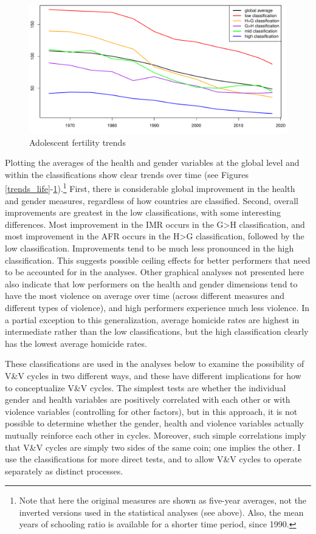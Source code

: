 \documentclass[12pt]{article}
\begin{document}
\begin{figure}[!htb]
    \centering
    \caption{Adolescent fertility trends}
    \label{trends_afr}
    \includegraphics[width=\textwidth]{trend_asfr_adol_wpp.pdf}
\end{figure}

Plotting the averages of the health and gender variables at the global level and within the classifications show clear trends over time (see Figures \ref{trends_life}-\ref{trends_afr}).\footnote{Note that here the original measures are shown as five-year averages, not the inverted versions used in the statistical analyses (see above). Also, the mean years of schooling ratio is available for a shorter time period, since 1990.}
First, there is considerable global improvement in the health and gender measures, regardless of how countries are classified.
Second, overall improvements are greatest in the low classifications, with some interesting differences. Most improvement in the IMR occurs in the {G>H} classification, and most improvement in the AFR occurs in the {H>G} classification, followed by the low classification.
Improvements tend to be much less pronounced in the high classification.
This suggests possible ceiling effects for better performers that need to be accounted for in the analyses.
Other graphical analyses not presented here also indicate that low performers on the health and gender dimensions tend to have the most violence on average over time (across different measures and different types of violence), and high performers experience much less violence. In a partial exception to this generalization, average homicide rates are highest in intermediate rather than the low classifications, but the high classification clearly has the lowest average homicide rates.

These classifications are used in the analyses below to examine the possibility of V\&V cycles in two different ways, and these have different implications for how to conceptualize V\&V cycles. The simplest tests are whether the individual gender and health variables are positively correlated with each other or with violence variables (controlling for other factors), but in this approach, it is not possible to determine whether the gender, health and violence variables actually mutually reinforce each other in cycles. Moreover, such simple correlations imply that V\&V cycles are simply two sides of the same coin; one implies the other. I use the classifications for more direct tests, and to allow V\&V cycles to operate separately as distinct processes.
\end{document}
